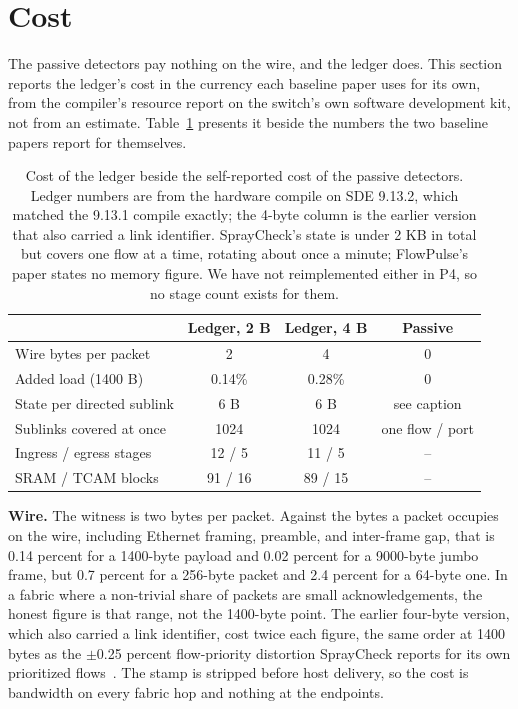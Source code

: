 \section{Cost}
\label{sec:cost}

The passive detectors pay nothing on the wire, and the ledger does. This section reports the ledger's cost in the currency each baseline paper uses for its own, from the compiler's resource report on the switch's own software development kit, not from an estimate. Table~\ref{tab:cost} presents it beside the numbers the two baseline papers report for themselves.

\begin{table}[t]
\caption{Cost of the ledger beside the self-reported cost of the passive detectors. Ledger numbers are from the hardware compile on SDE 9.13.2, which matched the 9.13.1 compile exactly; the 4-byte column is the earlier version that also carried a link identifier. SprayCheck's state is under 2 KB in total but covers one flow at a time, rotating about once a minute; FlowPulse's paper states no memory figure. We have not reimplemented either in P4, so no stage count exists for them.}
\label{tab:cost}
\centering
\footnotesize
\begin{tabular}{@{}lccc@{}}
\toprule
 & Ledger, 2 B & Ledger, 4 B & Passive \\
\midrule
Wire bytes per packet & 2 & 4 & 0 \\
Added load (1400 B) & 0.14\% & 0.28\% & 0 \\
State per directed sublink & 6 B & 6 B & see caption \\
Sublinks covered at once & 1024 & 1024 & one flow / port \\
Ingress / egress stages & 12 / 5 & 11 / 5 & -- \\
SRAM / TCAM blocks & 91 / 16 & 89 / 15 & -- \\
\bottomrule
\end{tabular}
\end{table}

\textbf{Wire.} The witness is two bytes per packet. Against the bytes a packet occupies on the wire, including Ethernet framing, preamble, and inter-frame gap, that is 0.14 percent for a 1400-byte payload and 0.02 percent for a 9000-byte jumbo frame, but 0.7 percent for a 256-byte packet and 2.4 percent for a 64-byte one. In a fabric where a non-trivial share of packets are small acknowledgements, the honest figure is that range, not the 1400-byte point. The earlier four-byte version, which also carried a link identifier, cost twice each figure, the same order at 1400 bytes as the $\pm$0.25 percent flow-priority distortion SprayCheck reports for its own prioritized flows~\cite{spraycheck}. The stamp is stripped before host delivery, so the cost is bandwidth on every fabric hop and nothing at the endpoints.

